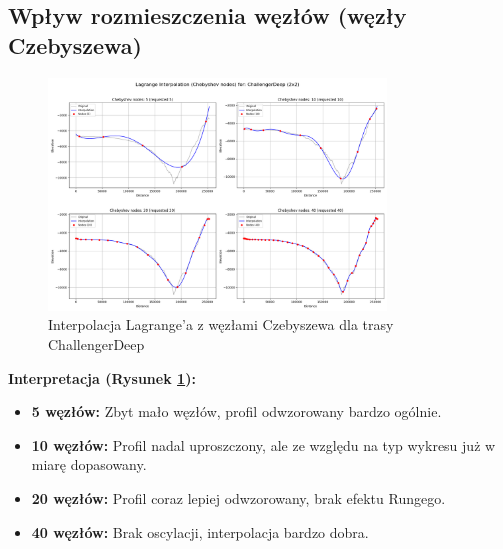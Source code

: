 \documentclass[11pt,a4paper]{article}
\begin{document}
\subsection{Wpływ rozmieszczenia węzłów (węzły Czebyszewa)}
\begin{figure}[H]
    \centering
    \includegraphics[width=0.8\textwidth]{../plots/ChallengerDeep_Lagrange_Chebyshev_2x2.png}
    \caption{Interpolacja Lagrange'a z węzłami Czebyszewa dla trasy ChallengerDeep}
    \label{fig:challengerdeep_chebyshev}
\end{figure}
\textbf{Interpretacja (Rysunek \ref{fig:challengerdeep_chebyshev}):} 
\begin{itemize}
    \item \textbf{5 węzłów:} Zbyt mało węzłów, profil odwzorowany bardzo ogólnie.
    \item \textbf{10 węzłów:} Profil nadal uproszczony, ale ze względu na typ wykresu już w miarę dopasowany.
    \item \textbf{20 węzłów:} Profil coraz lepiej odwzorowany, brak efektu Rungego.
    \item \textbf{40 węzłów:} Brak oscylacji, interpolacja bardzo dobra.
\end{itemize}
\end{document}

